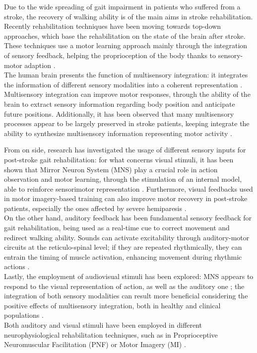 Due to the wide spreading of gait impairment in patients who suffered from a stroke, the recovery of walking ability is of the main aims in stroke rehabilitation. Recently rehabilitation techniques have been moving towards top-down approaches, which base the rehabilitation on the state of the brain after stroke. These techniques use a motor learning approach mainly through the integration of sensory feedback, helping the proprioception of the body thanks to sensory-motor adaption \parencite{Belda-Lois_2011}. \\
The human brain presents the function of multisensory integration: it integrates the information of different sensory modalities into a coherent representation \parencite{Stein_2008}. Multisensory integration can improve motor responses, through the ability of the brain to extract sensory information regarding body position and anticipate future positions. Additionally, it has been observed that many multisensory processes appear to be largely preserved in stroke patients, keeping integrate the ability to synthesize multisensory information representing motor activity \parencite{Bolognini_2013}.

From on side, research has investigated the usage of different sensory inputs for post-stroke gait rehabilitation: for what concerns visual stimuli, it has been shown that Mirror Neuron System (MNS) play a crucial role in action observation and motor learning, through the stimulation of an internal model, able to reinforce sensorimotor representation \parencite{Rizzolati_2004}. Furthermore, visual feedbacks used in motor imagery-based training can also improve motor recovery in post-stroke patients, especially the ones affected by severe hemiparesis \parencite{Mihara_2013}. \\
On the other hand, auditory feedback has been fundamental sensory feedback for gait rehabilitation, being used as a real-time cue to correct movement and redirect walking ability. Sounds can activate excitability through auditory-motor circuits at the reticulo-spinal level; if they are repeated rhythmically, they can entrain the timing of muscle activation, enhancing movement during rhythmic actions \parencite{Thaut_1999}. \\
Lastly, the employment of audiovisual stimuli has been explored: MNS appears to respond to the visual representation of action, as well as the auditory one \parencite{Rizzolati_2004}; the integration of both sensory modalities can result more beneficial considering the positive effects of multisensory integration, both in healthy and clinical populations \parencite{Bolognini_2015}. \\
Both auditory and visual stimuli have been employed in different neurophysiological rehabilitation techniques, such as in Proprioceptive Neuromuscular Facilitation (PNF) \parencite{Moros_2000} or Motor Imagery (MI) \parencite{Mason_2007}. 


